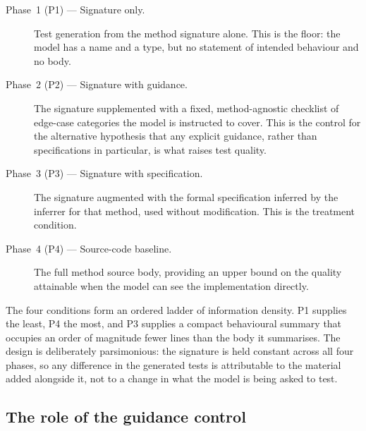 \begin{description}
  \item[Phase~1 (P1) --- Signature only.] Test generation from the method
    signature alone. This is the floor: the model has a name and a type, but no
    statement of intended behaviour and no body.
  \item[Phase~2 (P2) --- Signature with guidance.] The signature supplemented with
    a fixed, method-agnostic checklist of edge-case categories the model is
    instructed to cover. This is the control for the alternative hypothesis that
    any explicit guidance, rather than specifications in particular, is what raises
    test quality.
  \item[Phase~3 (P3) --- Signature with specification.] The signature augmented
    with the formal specification inferred by the inferrer for that method, used
    without modification. This is the treatment condition.
  \item[Phase~4 (P4) --- Source-code baseline.] The full method source body,
    providing an upper bound on the quality attainable when the model can see the
    implementation directly.
\end{description}

The four conditions form an ordered ladder of information density. P1 supplies the
least, P4 the most, and P3 supplies a compact behavioural summary that occupies an
order of magnitude fewer lines than the body it summarises. The design is
deliberately parsimonious: the signature is held constant across all four phases,
so any difference in the generated tests is attributable to the material added
alongside it, not to a change in what the model is being asked to test.

\subsection{The role of the guidance control}
\label{sec:art1:p2-control}

